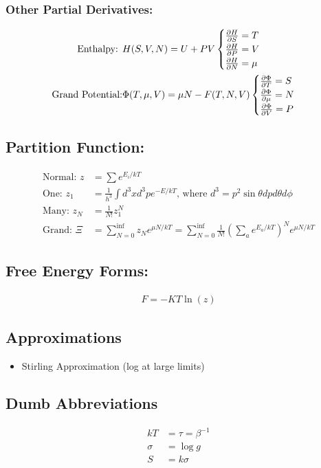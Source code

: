 \subsubsection*{Other Partial Derivatives:}

\begin{align}
	\text{Enthalpy: }       & H(S, V, N) = U + PV
	\begin{cases}
		\pdv{H}{S} = T   \\
		\pdv{H}{P} = V   \\
		\pdv{H}{N} = \mu \\
	\end{cases}                                               \\
	\text{Grand Potential:} & \Phi(T, \mu, V) = \mu N - F(T, N, V)
	\begin{cases}
		\pdv{\Phi}{T} = S   \\
		\pdv{\Phi}{\mu} = N \\
		\pdv{\Phi}{V} = P   \\
	\end{cases}
\end{align}


\subsection*{Partition Function:}

\begin{align}
	\text{Normal:  } z &= \sum e^{E_i / kT}                                                                                            \\
	\text{One: } z_1   &= \frac{1}{h^3} \int d^3x d^3p e^{-E/ kT}\text{, where } d^3 = p^2\sin\theta dp d\theta d\phi                  \\
	\text{Many: } z_N  &= \frac{1}{N!} z_1^N                                                                                           \\
	\text{Grand: } \Xi &= \sum_{N=0}^{\inf} z_N e^{\mu N / kT} = \sum_{N=0}^{\inf} \frac{1}{N!} (\sum_a e^{E_a / kT})^N e^{\mu N / kT}
\end{align}


\subsection*{Free Energy Forms:}
\begin{align}
	F = - KT \ln(z)
\end{align}

\subsection*{Approximations}

\begin{itemize}
    \item Stirling Approximation (log at large limits)
\end{itemize}


\subsection*{Dumb Abbreviations}
\begin{align*}
	k T &= \tau  = \beta^{-1} \\
	\sigma &= \log g \\
	S &= k \sigma 
\end{align*}
